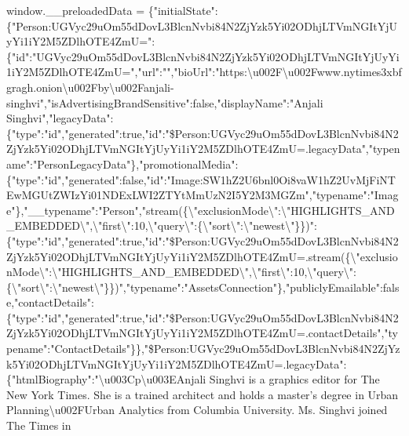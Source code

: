 window.\_\_preloadedData =
\{"initialState":\{"Person:UGVyc29uOm55dDovL3BlcnNvbi84N2ZjYzk5Yi02ODhjLTVmNGItYjUyYi1iY2M5ZDlhOTE4ZmU=":\{"id":"UGVyc29uOm55dDovL3BlcnNvbi84N2ZjYzk5Yi02ODhjLTVmNGItYjUyYi1iY2M5ZDlhOTE4ZmU=","url":"","bioUrl":"https:\textbackslash{}u002F\textbackslash{}u002Fwww.nytimes3xbfgragh.onion\textbackslash{}u002Fby\textbackslash{}u002Fanjali-singhvi","isAdvertisingBrandSensitive":false,"displayName":"Anjali
Singhvi","legacyData":\{"type":"id","generated":true,"id":"\$Person:UGVyc29uOm55dDovL3BlcnNvbi84N2ZjYzk5Yi02ODhjLTVmNGItYjUyYi1iY2M5ZDlhOTE4ZmU=.legacyData","typename":"PersonLegacyData"\},"promotionalMedia":\{"type":"id","generated":false,"id":"Image:SW1hZ2U6bnl0Oi8vaW1hZ2UvMjFiNTEwMGUtZWIzYi01NDExLWI2ZTYtMmUzN2I5Y2M3MGZm","typename":"Image"\},"\_\_typename":"Person","stream(\{\textbackslash{}"exclusionMode\textbackslash{}":\textbackslash{}"HIGHLIGHTS\_AND\_EMBEDDED\textbackslash{}",\textbackslash{}"first\textbackslash{}":10,\textbackslash{}"query\textbackslash{}":\{\textbackslash{}"sort\textbackslash{}":\textbackslash{}"newest\textbackslash{}"\}\})":\{"type":"id","generated":true,"id":"\$Person:UGVyc29uOm55dDovL3BlcnNvbi84N2ZjYzk5Yi02ODhjLTVmNGItYjUyYi1iY2M5ZDlhOTE4ZmU=.stream(\{\textbackslash{}"exclusionMode\textbackslash{}":\textbackslash{}"HIGHLIGHTS\_AND\_EMBEDDED\textbackslash{}",\textbackslash{}"first\textbackslash{}":10,\textbackslash{}"query\textbackslash{}":\{\textbackslash{}"sort\textbackslash{}":\textbackslash{}"newest\textbackslash{}"\}\})","typename":"AssetsConnection"\},"publiclyEmailable":false,"contactDetails":\{"type":"id","generated":true,"id":"\$Person:UGVyc29uOm55dDovL3BlcnNvbi84N2ZjYzk5Yi02ODhjLTVmNGItYjUyYi1iY2M5ZDlhOTE4ZmU=.contactDetails","typename":"ContactDetails"\}\},"\$Person:UGVyc29uOm55dDovL3BlcnNvbi84N2ZjYzk5Yi02ODhjLTVmNGItYjUyYi1iY2M5ZDlhOTE4ZmU=.legacyData":\{"htmlBiography":"\textbackslash{}u003Cp\textbackslash{}u003EAnjali
Singhvi is a graphics editor for The New York Times. She is a trained
architect and holds a master's degree in Urban
Planning\textbackslash{}u002FUrban Analytics from Columbia University.
Ms. Singhvi joined The Times in

